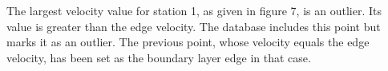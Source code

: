 The largest velocity value for station 1, as given in figure 7, is an outlier.
Its value is greater than the edge velocity.  The database includes this point
but marks it as an outlier.  The previous point, whose velocity equals the edge
velocity, has been set as the boundary layer edge in that case.
